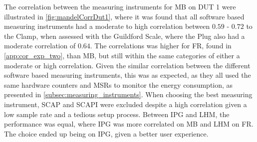 The correlation between the measuring instruments for MB on DUT 1 were illustrated in \cref{fig:mandelCorrDut1}, where it was found that all software based measuring instruments had a moderate to high correlation between $0.59$ - $0.72$ to the Clamp, when assessed with the Guildford Scale, where the Plug also had a moderate correlation of $0.64$. The correlations was higher for FR, found in \cref{app:cor_exp_two}, than MB, but still within the same categories of either a moderate or high correlation. Given the similar correlation between the different software based measuring instruments, this was as expected, as they all used the same hardware counters and MSRs to monitor the energy consumption, as presented in \cref{subsec:measuring_instruments}. When choosing the best measuring instrument, SCAP and SCAPI were excluded despite a high correlation given a low sample rate and a tedious setup process. Between IPG and LHM, the performance was equal, where IPG was more correlated on MB and LHM on FR. The choice ended up being on IPG, given a better user experience. 


